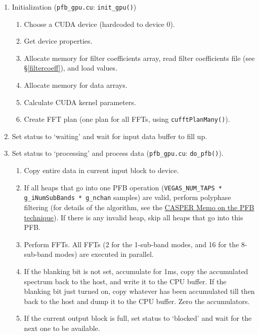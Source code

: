 \documentclass[11pt]{article} %
\begin{document}
\begin{enumerate}
  \item Initialization ({\tt pfb\_gpu.cu}: {\tt init\_gpu()})
    \begin{enumerate}
      \item Choose a CUDA device (hardcoded to device 0).
      \item Get device properties.
      \item Allocate memory for filter coefficients array, read filter
            coefficients file (see \S\ref{filtercoeff}), and load values.
      \item Allocate memory for data arrays.
      \item Calculate CUDA kernel parameters.
      \item Create FFT plan (one plan for all FFTs, using {\tt cufftPlanMany()}).
    \end{enumerate}
  \item Set status to `waiting' and wait for input data buffer to fill up.
  \item Set status to `processing' and process data ({\tt pfb\_gpu.cu}: {\tt do\_pfb()}).
    \begin{enumerate}
      \item Copy entire data in current input block to device.
      \item If all heaps that go into one PFB operation ({\tt VEGAS\_NUM\_TAPS * g\_iNumSubBands * g\_nchan} samples)
            are valid, perform polyphase filtering (for details of the algorithm, see the
            \href{https://casper.berkeley.edu/wiki/The_Polyphase_Filter_Bank_Technique}
            {CASPER Memo on the PFB technique}). If there is any invalid heap,
            skip all heaps that go into this PFB.
      \item Perform FFTs. All FFTs (2 for the 1-sub-band modes, and 16 for the 8-sub-band modes)
            are executed in parallel.
      \item If the blanking bit is not set, accumulate for 1ms, copy the accumulated
            spectrum back to the host, and write it to the CPU buffer. If the
            blanking bit just turned on, copy whatever has been accumulated till then
            back to the host and dump it to the CPU buffer. Zero the accumulators.
      \item If the current output block is full, set status to `blocked' and wait
            for the next one to be available.
    \end{enumerate}
\end{enumerate}
\end{document}
